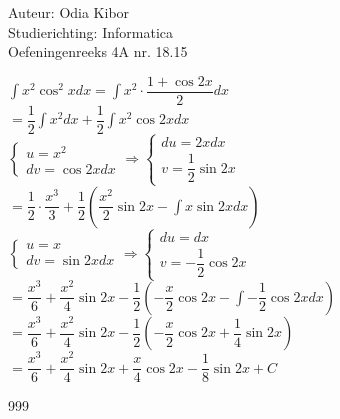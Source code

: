 \documentclass[a4paper]{article}
\begin{document}
  
\noindent \large Auteur: Odia Kibor \\
\noindent \large Studierichting: Informatica\\
\noindent \large Oefeningenreeks 4A nr. 18.15\\

\medskip

\normalsize


$\displaystyle\int x^2 \cos^2 x dx = \displaystyle\int x^2 \cdot \dfrac{1 + \cos 2x}{2} dx$\\

$= \dfrac{1}{2} \displaystyle\int x^2 dx + \dfrac{1}{2} \displaystyle\int x^2 \cos 2x dx$\\

$\left\{
\begin{array}{l}
	u = x^2 \\ 
	dv = \cos 2x dx
\end{array}\right.
\Rightarrow 
\left\{
\begin{array}{l}
	du = 2x dx\\
 	v = \dfrac{1}{2} \sin 2x 
\end{array}
\right.$\\

$= \dfrac{1}{2} \cdot \dfrac{x^3}{3} + \dfrac{1}{2} \left(\dfrac{x^2}{2} \sin 2x -\displaystyle\int x \sin 2x dx \right)$\\

$\left\{
\begin{array}{l}
	u = x \\ 
	dv = \sin 2x dx
\end{array}\right.
\Rightarrow 
\left\{
\begin{array}{l}
	du = dx\\
 	v = -\dfrac{1}{2} \cos 2x 
\end{array}
\right.$\\

$= \dfrac{x^3}{6} + \dfrac{x^2}{4} \sin 2x - \dfrac{1}{2} \left(-\dfrac{x}{2} \cos 2x -\displaystyle\int -\dfrac{1}{2} \cos 2x dx \right)$\\

$= \dfrac{x^3}{6} + \dfrac{x^2}{4} \sin 2x - \dfrac{1}{2} \left(-\dfrac{x}{2} \cos 2x + \dfrac{1}{4} \sin 2x \right)$\\

$= \dfrac{x^3}{6} + \dfrac{x^2}{4} \sin 2x + \dfrac{x}{4} \cos 2x - \dfrac{1}{8} \sin 2x + C$\\



















\begin{thebibliography}{999}
\end{thebibliography}
\end{document}
